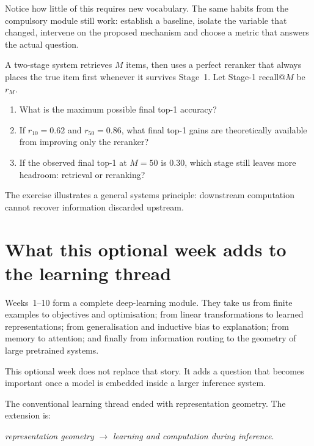 Notice how little of this requires new vocabulary. The same habits from the compulsory module still work: establish a baseline, isolate the variable that changed, intervene on the proposed mechanism and choose a metric that answers the actual question.

\begin{optionalexercise}[title={Optional mathematics --- a simple retrieval ceiling}]
A two-stage system retrieves \(M\) items, then uses a perfect reranker that always places the true item first whenever it survives Stage~1. Let Stage-1 recall@\(M\) be \(r_M\).

\begin{enumerate}[leftmargin=*]
  \item What is the maximum possible final top-1 accuracy?
  \item If \(r_{10}=0.62\) and \(r_{50}=0.86\), what final top-1 gains are theoretically available from improving only the reranker?
  \item If the observed final top-1 at \(M=50\) is 0.30, which stage still leaves more headroom: retrieval or reranking?
\end{enumerate}

The exercise illustrates a general systems principle: downstream computation cannot recover information discarded upstream.
\end{optionalexercise}

\section{What this optional week adds to the learning thread}

Weeks~1--10 form a complete deep-learning module. They take us from finite examples to objectives and optimisation; from linear transformations to learned representations; from generalisation and inductive bias to explanation; from memory to attention; and finally from information routing to the geometry of large pretrained systems.

This optional week does not replace that story. It adds a question that becomes important once a model is embedded inside a larger inference system.

The conventional learning thread ended with representation geometry. The extension is:
\begin{center}
  \emph{representation geometry} \(\longrightarrow\) \emph{learning and computation during inference}.
\end{center}

